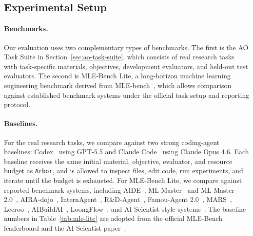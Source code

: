 \documentclass{llmxive}
\providecommand{\arbor}{\texttt{Arbor}}
\begin{document}
\subsection{Experimental Setup}
\label{sec:exp-setup}

\paragraph{Benchmarks.}
Our evaluation uses two complementary types of benchmarks. The first is the AO
Task Suite in Section~\ref{sec:ao-task-suite}, which consists of real research
tasks with task-specific materials, objectives, development evaluators, and
held-out test evaluators. The second is MLE-Bench Lite, a long-horizon machine
learning engineering benchmark derived from MLE-bench~\citep{mlebench}, which
allows comparison against established benchmark systems under the official task
setup and reporting protocol. 

\paragraph{Baselines.}
For the real research tasks, we compare against two strong coding-agent
baselines: Codex~\citep{codex} using GPT-5.5 and Claude Code~\citep{claudecode} using Claude Opus 4.6. Each
baseline receives the same initial material, objective, evaluator, and resource
budget as \arbor{}, and is allowed to inspect files, edit code, run experiments,
and iterate until the budget is exhausted. For MLE-Bench Lite, we compare
against reported benchmark systems, including AIDE~\citep{aide},
ML-Master~\citep{mlmaster} and ML-Master 2.0~\citep{mlmaster2},
AIRA-dojo~\citep{airadojo}, InternAgent~\citep{internagent},
R\&D-Agent~\citep{rdagent}, Famou-Agent 2.0~\citep{famouagent},
MARS~\citep{mars}, Leeroo~\citep{kapso},
AIBuildAI~\citep{aibuildai}, LoongFlow~\citep{loongflow}, and
AI-Scientist-style systems~\citep{aiscientist,aiscientist_long}. The baseline numbers in Table~\ref{tab:mle-lite} are adopted from the
official MLE-Bench leaderboard and the AI-Scientist paper~\cite{aiscientist_long}.
\end{document}
